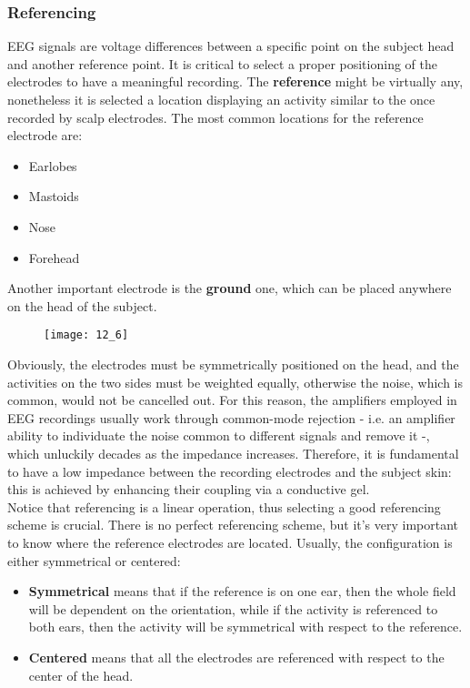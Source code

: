 \subsubsection{Referencing}
EEG signals are voltage differences between a specific point on the subject head and another
reference point. It is critical to select a proper positioning of the electrodes to have a
meaningful recording. The \textbf{reference} might be virtually any, nonetheless it is selected a
location displaying an activity similar to the once recorded by scalp electrodes.
The most common locations for the reference electrode are:
\begin{itemize}
    \item Earlobes
    \item Mastoids
    \item Nose
    \item Forehead
\end{itemize}
Another important electrode is the \textbf{ground} one, which can be placed anywhere on the head of the
subject.
\begin{figure}[H]
    \centering
    \texttt{[image: 12\_6]}
\end{figure}
Obviously, the electrodes must be symmetrically positioned on the head, and the activities on the two sides
must be weighted equally, otherwise the noise, which is common, would not be cancelled out.
For this reason, the amplifiers employed in EEG recordings usually work through common-mode rejection
- i.e. an amplifier ability to individuate the noise common to different signals and remove
it -, which unluckily decades as the impedance increases. Therefore, it is fundamental to
have a low impedance between the recording electrodes and the subject skin: this is achieved
by enhancing their coupling via a conductive gel.\\
Notice that referencing is a linear operation, thus selecting a good referencing scheme is
crucial. There is no perfect referencing scheme, but it's very important to know where the reference electrodes
are located. Usually, the configuration is either symmetrical or centered:
\begin{itemize}
    \item \textbf{Symmetrical} means that if the reference is on one ear, then the whole field will be dependent
          on the orientation, while if the activity is referenced to both ears, then the activity will be symmetrical
          with respect to the reference.
    \item \textbf{Centered} means that all the electrodes are referenced with respect to the center of the head.
\end{itemize}
